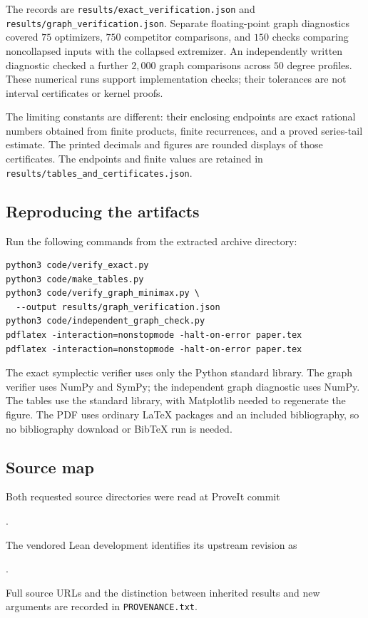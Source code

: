 The records are \texttt{results/exact\_verification.json} and
\texttt{results/graph\_verification.json}. Separate floating-point graph
diagnostics covered $75$ optimizers, $750$ competitor comparisons, and
$150$ checks comparing noncollapsed inputs with the collapsed extremizer. An independently
written diagnostic checked a further $2{,}000$ graph comparisons across
$50$ degree profiles. These numerical runs support implementation checks;
their tolerances are not interval certificates or kernel proofs.

The limiting constants are different: their enclosing endpoints are exact
rational numbers obtained from finite products, finite recurrences, and a
proved series-tail estimate. The printed decimals and figures are rounded
displays of those certificates. The endpoints and finite values are retained
in \texttt{results/tables\_and\_certificates.json}.

\subsection{Reproducing the artifacts}

Run the following commands from the extracted archive directory:
\begin{verbatim}
python3 code/verify_exact.py
python3 code/make_tables.py
python3 code/verify_graph_minimax.py \
  --output results/graph_verification.json
python3 code/independent_graph_check.py
pdflatex -interaction=nonstopmode -halt-on-error paper.tex
pdflatex -interaction=nonstopmode -halt-on-error paper.tex
\end{verbatim}
The exact symplectic verifier uses only the Python standard library.
The graph verifier uses NumPy and SymPy; the independent graph diagnostic
uses NumPy. The tables use the standard library, with Matplotlib needed
to regenerate the figure. The PDF uses ordinary LaTeX packages and an
included bibliography, so no bibliography download or BibTeX run is needed.

\subsection{Source map}

Both requested source directories were read at ProveIt commit
\begin{center}\small\sourcecommit.\end{center}
The vendored Lean development identifies its upstream revision as
\begin{center}\small\upstreamcommit.\end{center}
Full source URLs and
the distinction between inherited results and new arguments are recorded
in \texttt{PROVENANCE.txt}.

